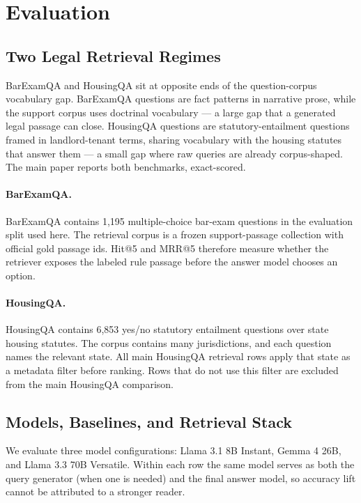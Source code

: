 \section{Evaluation}\label{sec:experiment}

\subsection{Two Legal Retrieval Regimes}

BarExamQA and HousingQA sit at opposite ends of the question-corpus
vocabulary gap. BarExamQA questions are fact patterns in narrative prose,
while the support corpus uses doctrinal vocabulary --- a large gap that a
generated legal passage can close. HousingQA questions are
statutory-entailment questions framed in landlord-tenant terms, sharing
vocabulary with the housing statutes that answer them --- a small gap where
raw queries are already corpus-shaped. The main paper reports both
benchmarks, exact-scored.

\paragraph{BarExamQA.}
BarExamQA contains 1,195 multiple-choice bar-exam questions in the evaluation
split used here. The retrieval corpus is a frozen support-passage collection
with official gold passage ids. Hit@5 and MRR@5 therefore measure whether the
retriever exposes the labeled rule passage before the answer model chooses an
option.

\paragraph{HousingQA.}
HousingQA contains 6,853 yes/no statutory entailment questions over state
housing statutes. The corpus contains many jurisdictions, and each question
names the relevant state. All main HousingQA retrieval rows apply that state
as a metadata filter before ranking. Rows that do not use this filter are
excluded from the main HousingQA comparison.

\subsection{Models, Baselines, and Retrieval Stack}

We evaluate three model configurations: Llama 3.1 8B Instant, Gemma 4 26B,
and Llama 3.3 70B Versatile. Within each row the same model serves as both
the query generator (when one is needed) and the final answer model, so
accuracy lift cannot be attributed to a stronger reader.

